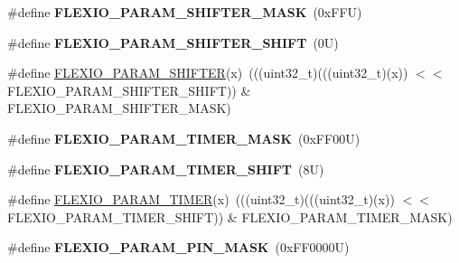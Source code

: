\begin{DoxyCompactItemize}
\item 
\mbox{\label{group___f_l_e_x_i_o___register___masks_gab6b5563b926eaf5278c4a7b4b9c8f3da}} 
\#define {\bfseries F\+L\+E\+X\+I\+O\+\_\+\+P\+A\+R\+A\+M\+\_\+\+S\+H\+I\+F\+T\+E\+R\+\_\+\+M\+A\+SK}~(0x\+F\+F\+U)
\item 
\mbox{\label{group___f_l_e_x_i_o___register___masks_gabb596498923334f66abeb79a1ee47f99}} 
\#define {\bfseries F\+L\+E\+X\+I\+O\+\_\+\+P\+A\+R\+A\+M\+\_\+\+S\+H\+I\+F\+T\+E\+R\+\_\+\+S\+H\+I\+FT}~(0\+U)
\item 
\#define \mbox{\hyperlink{group___f_l_e_x_i_o___register___masks_gae8b0784165611b4b213654bc937da3db}{F\+L\+E\+X\+I\+O\+\_\+\+P\+A\+R\+A\+M\+\_\+\+S\+H\+I\+F\+T\+ER}}(x)~(((uint32\+\_\+t)(((uint32\+\_\+t)(x)) $<$$<$ F\+L\+E\+X\+I\+O\+\_\+\+P\+A\+R\+A\+M\+\_\+\+S\+H\+I\+F\+T\+E\+R\+\_\+\+S\+H\+I\+FT)) \& F\+L\+E\+X\+I\+O\+\_\+\+P\+A\+R\+A\+M\+\_\+\+S\+H\+I\+F\+T\+E\+R\+\_\+\+M\+A\+SK)
\item 
\mbox{\label{group___f_l_e_x_i_o___register___masks_ga7a9e7eefa67ec21d58007a54631bc7df}} 
\#define {\bfseries F\+L\+E\+X\+I\+O\+\_\+\+P\+A\+R\+A\+M\+\_\+\+T\+I\+M\+E\+R\+\_\+\+M\+A\+SK}~(0x\+F\+F00\+U)
\item 
\mbox{\label{group___f_l_e_x_i_o___register___masks_ga3cfa8749e5a00e78e43a384b6cc2c67a}} 
\#define {\bfseries F\+L\+E\+X\+I\+O\+\_\+\+P\+A\+R\+A\+M\+\_\+\+T\+I\+M\+E\+R\+\_\+\+S\+H\+I\+FT}~(8\+U)
\item 
\#define \mbox{\hyperlink{group___f_l_e_x_i_o___register___masks_gae34e7ac3912a8de2d399d7c0bfb664a0}{F\+L\+E\+X\+I\+O\+\_\+\+P\+A\+R\+A\+M\+\_\+\+T\+I\+M\+ER}}(x)~(((uint32\+\_\+t)(((uint32\+\_\+t)(x)) $<$$<$ F\+L\+E\+X\+I\+O\+\_\+\+P\+A\+R\+A\+M\+\_\+\+T\+I\+M\+E\+R\+\_\+\+S\+H\+I\+FT)) \& F\+L\+E\+X\+I\+O\+\_\+\+P\+A\+R\+A\+M\+\_\+\+T\+I\+M\+E\+R\+\_\+\+M\+A\+SK)
\item 
\mbox{\label{group___f_l_e_x_i_o___register___masks_gac30e81b2fc5366daa13deb07637f962c}} 
\#define {\bfseries F\+L\+E\+X\+I\+O\+\_\+\+P\+A\+R\+A\+M\+\_\+\+P\+I\+N\+\_\+\+M\+A\+SK}~(0x\+F\+F0000\+U)
\item 

\end{DoxyCompactItemize}
